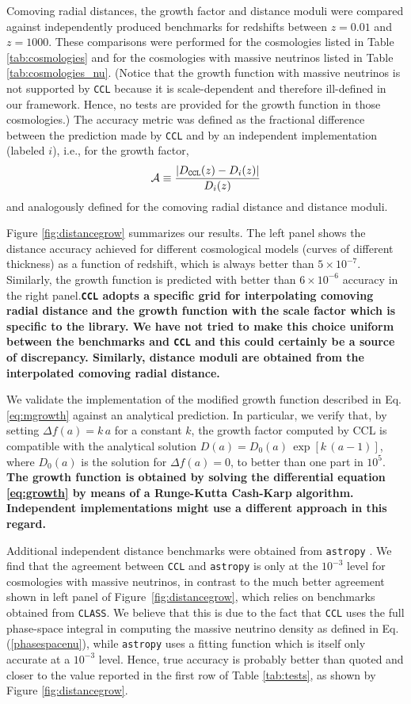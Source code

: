 \documentclass[\docopts]{\docclass}
\newcommand{\ccl}{{\tt CCL}\xspace}
\begin{document}
Comoving radial distances, the growth factor and distance moduli were compared against independently produced benchmarks for redshifts between $z = 0.01$ and $z = 1000$. These comparisons were performed for the cosmologies listed in Table \ref{tab:cosmologies} and for the cosmologies with massive neutrinos listed in Table \ref{tab:cosmologies_nu}. (Notice that the growth function with massive neutrinos is not supported by \ccl because it is scale-dependent and therefore ill-defined in our framework. Hence, no tests are provided for the growth function in those cosmologies.) The accuracy metric was defined as the fractional difference between the prediction made by \ccl and by an independent implementation (labeled $i$), i.e., for the growth factor,
\begin{equation}
  \mathcal{A} \equiv \frac{|D_{\tt CCL}(z)-D_{i}(z)|}{D_i(z)}
\end{equation}
and analogously defined for the comoving radial distance and distance moduli.

Figure \ref{fig:distancegrow} summarizes our results. The left panel shows the distance accuracy achieved for different cosmological models (curves of different thickness) as a function of redshift, which is always better than $5\times 10^{-7}$. Similarly, the growth function is predicted with better than $6\times 10^{-6}$ accuracy in the right panel.{\bf \ccl adopts a specific grid for interpolating comoving radial distance and the growth function with the scale factor which is specific to the library. We have not tried to make this choice uniform between the benchmarks and \ccl and this could certainly be a source of discrepancy. Similarly, distance moduli are obtained from the interpolated comoving radial distance.}

We validate the implementation of the modified growth function described in Eq. \ref{eq:mgrowth} against an analytical prediction. In particular, we verify that, by setting $\Delta f(a)=k\,a$ for a constant $k$, the growth factor computed by CCL is compatible with the analytical solution $D(a)=D_0(a)\,\exp[k\,(a-1)]$, where $D_0(a)$ is the solution for $\Delta f(a)=0$, to better than one part in $10^{5}$. {\bf The growth function is obtained by solving the differential equation \ref{eq:growth} by means of a Runge-Kutta Cash-Karp algorithm. Independent implementations might use a different approach in this regard.}

Additional independent distance benchmarks were obtained from {\tt astropy} \citep{astropy}. We find that the agreement between \ccl and {\tt astropy} is only at the $10^{-3}$ level for cosmologies with massive neutrinos, in contrast to the much better agreement shown in left panel of Figure~\ref{fig:distancegrow}, which relies on benchmarks obtained from {\tt CLASS}. We believe that this is due to the fact that \ccl uses the full phase-space integral in computing the massive neutrino density as defined in Eq. (\ref{phasespacenu}), while {\tt astropy} uses a fitting function which is itself only accurate at a $10^{-3}$ level. Hence, true accuracy is probably better than quoted and closer to the value reported in the first row of Table \ref{tab:tests}, as shown by Figure \ref{fig:distancegrow}.
\end{document}
